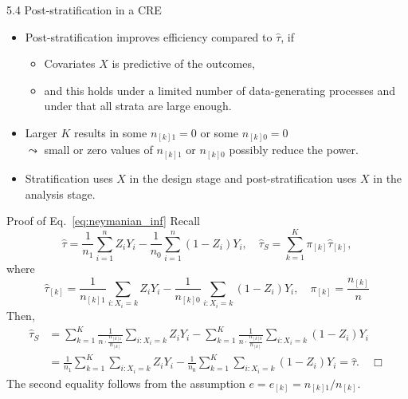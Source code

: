 \documentclass[aspectratio=169, 12pt]{beamer}
\begin{document}
\begin{frame}{5.4 Post-stratification in a CRE}
  \begin{itemize}
    \item Post-stratification improves efficiency compared to $\widehat{\tau}$, if
    \begin{itemize}
      \item Covariates $X$ is predictive of the outcomes,
      \item and this holds under a limited number of data-generating processes and under that all strata are large enough.
    \end{itemize}
    \item Larger $K$ results in some $n_{[k]1}=0$ or some $n_{[k]0}=0$ \\
    $\leadsto$ small or zero values of $n_{[k]1}$ or $n_{[k]0}$ possibly reduce the power. 
    \item Stratification uses $X$ in the design stage and post-stratification uses $X$ in the analysis stage.
  \end{itemize}
\end{frame}

\begin{frame}[label=pf-neymanian]{Proof of Eq.~\eqref{eq:neymanian_inf}}
  \footnotesize
    Recall 
    \[
    \widehat{\tau} = \frac{1}{n_1}\sum_{i=1}^{n}Z_iY_i-\frac{1}{n_0}\sum_{i=1}^{n}(1-Z_i)Y_i, \quad \widehat{\tau}_S = \sum_{k=1}^{K}\pi_{[k]}\widehat{\tau}_{[k]},
    \]
    where 
    \[
    \widehat{\tau}_{[k]} = \frac{1}{n_{[k]1}}\sum_{i:X_i=k}^{}Z_iY_i - \frac{1}{n_{[k]0}}\sum_{i:X_i=k}^{}(1-Z_i)Y_i, \quad \pi_{[k]} = \frac{n_{[k]}}{n}
    \]
    Then,
    \begin{align*}
      \widehat{\tau}_S 
      &= \sum_{k=1}^{K}\frac{1}{n\cdot \frac{n_{[k]1}}{n_{[k]}}}\sum_{i:X_i=k}^{}Z_iY_i - \sum_{k=1}^{K}\frac{1}{n\cdot \frac{n_{[k]0}}{n_{[k]}}}\sum_{i:X_i=k}^{}(1-Z_i)Y_i \\
      &= \frac{1}{n_1}\sum_{k=1}^{K}\sum_{i:X_i=k}^{}Z_iY_i-\frac{1}{n_0}\sum_{k=1}^{K}\sum_{i:X_i=k}^{}(1-Z_i)Y_i
      =\widehat{\tau}. \quad \Box
    \end{align*}
    The second equality follows from the assumption $e=e_{[k]}=n_{[k]1}/n_{[k]}.$
  \vfill
  \hfill\hyperlink{neymanian<1>}{}
\end{frame}
\end{document}
